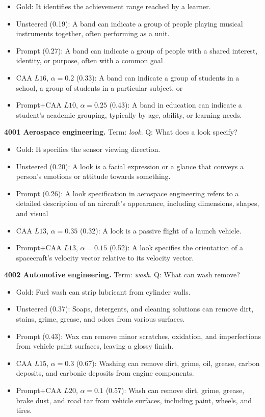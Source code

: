 \begin{itemize}\setlength{\itemsep}{0.15em}\setlength{\parsep}{0pt}\setlength{\topsep}{0.2em}
\item Gold: It identifies the achievement range reached by a learner.
\item Unsteered (0.19): A band can indicate a group of people playing musical instruments together, often performing as a unit.
\item Prompt (0.27): A band can indicate a group of people with a shared interest, identity, or purpose, often with a common goal
\item CAA $L16$, $\alpha=0.2$ (0.33): A band can indicate a group of students in a school, a group of students in a particular subject, or
\item Prompt+CAA $L10$, $\alpha=0.25$ (0.43): A band in education can indicate a student's academic grouping, typically by age, ability, or learning needs.
\end{itemize}
\medskip\noindent\textbf{4001 Aerospace engineering.} Term: \emph{look}.
Q: What does a look specify?
\begin{itemize}\setlength{\itemsep}{0.15em}\setlength{\parsep}{0pt}\setlength{\topsep}{0.2em}
\item Gold: It specifies the sensor viewing direction.
\item Unsteered (0.20): A look is a facial expression or a glance that conveys a person's emotions or attitude towards something.
\item Prompt (0.26): A look specification in aerospace engineering refers to a detailed description of an aircraft's appearance, including dimensions, shapes, and visual
\item CAA $L13$, $\alpha=0.35$ (0.32): A look is a passive flight of a launch vehicle.
\item Prompt+CAA $L13$, $\alpha=0.15$ (0.52): A look specifies the orientation of a spacecraft's velocity vector relative to its velocity vector.
\end{itemize}
\medskip\noindent\textbf{4002 Automotive engineering.} Term: \emph{wash}.
Q: What can wash remove?
\begin{itemize}\setlength{\itemsep}{0.15em}\setlength{\parsep}{0pt}\setlength{\topsep}{0.2em}
\item Gold: Fuel wash can strip lubricant from cylinder walls.
\item Unsteered (0.37): Soaps, detergents, and cleaning solutions can remove dirt, stains, grime, grease, and odors from various surfaces.
\item Prompt (0.43): Wax can remove minor scratches, oxidation, and imperfections from vehicle paint surfaces, leaving a glossy finish.
\item CAA $L15$, $\alpha=0.3$ (0.67): Washing can remove dirt, grime, oil, grease, carbon deposits, and carbonic deposits from engine components.
\item Prompt+CAA $L20$, $\alpha=0.1$ (0.57): Wash can remove dirt, grime, grease, brake dust, and road tar from vehicle surfaces, including paint, wheels, and tires.
\end{itemize}
